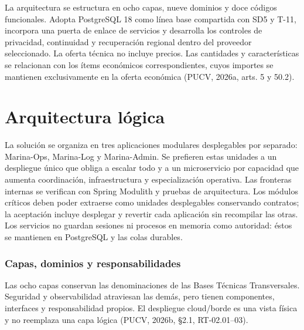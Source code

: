 \documentclass[11pt,letterpaper]{report}
\begin{document}
La arquitectura se estructura en ocho capas, nueve dominios y doce códigos funcionales. Adopta PostgreSQL 18 como línea base compartida con SD5 y T-11, incorpora una puerta de enlace de servicios y desarrolla los controles de privacidad, continuidad y recuperación regional dentro del proveedor seleccionado. La oferta técnica no incluye precios. Las cantidades y características se relacionan con los ítems económicos correspondientes, cuyos importes se mantienen exclusivamente en la oferta económica (PUCV, 2026a, arts. 5 y 50.2).

\section{Arquitectura lógica}
La solución se organiza en tres aplicaciones modulares desplegables por separado: Marina-Ops, Marina-Log y Marina-Admin. Se prefieren estas unidades a un despliegue único que obliga a escalar todo y a un microservicio por capacidad que aumenta coordinación, infraestructura y especialización operativa. Las fronteras internas se verifican con Spring Modulith y pruebas de arquitectura. Los módulos críticos deben poder extraerse como unidades desplegables conservando contratos; la aceptación incluye desplegar y revertir cada aplicación sin recompilar las otras. Los servicios no guardan sesiones ni procesos en memoria como autoridad: éstos se mantienen en PostgreSQL y las colas durables.

\subsubsection*{Capas, dominios y responsabilidades}
Las ocho capas conservan las denominaciones de las Bases Técnicas Transversales. Seguridad y observabilidad atraviesan las demás, pero tienen componentes, interfaces y responsabilidad propios. El despliegue cloud/borde es una vista física y no reemplaza una capa lógica (PUCV, 2026b, §2.1, RT-02.01--03).
\end{document}
